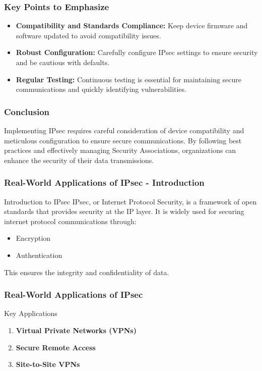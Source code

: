 \documentclass{beamer}
\begin{document}
\begin{frame}
    \frametitle{Key Points to Emphasize}
    \begin{itemize}
        \item \textbf{Compatibility and Standards Compliance:} Keep device firmware and software updated to avoid compatibility issues.
        \item \textbf{Robust Configuration:} Carefully configure IPsec settings to ensure security and be cautious with defaults.
        \item \textbf{Regular Testing:} Continuous testing is essential for maintaining secure communications and quickly identifying vulnerabilities.
    \end{itemize}
\end{frame}

\begin{frame}
    \frametitle{Conclusion}
    Implementing IPsec requires careful consideration of device compatibility and meticulous configuration to ensure secure communications. By following best practices and effectively managing Security Associations, organizations can enhance the security of their data transmissions.
\end{frame}

\begin{frame}[fragile]
    \frametitle{Real-World Applications of IPsec - Introduction}
    \begin{block}{Introduction to IPsec}
        IPsec, or Internet Protocol Security, is a framework of open standards that provides security at the IP layer. 
        It is widely used for securing internet protocol communications through:
        \begin{itemize}
            \item Encryption
            \item Authentication
        \end{itemize}
        This ensures the integrity and confidentiality of data.
    \end{block}
\end{frame}

\begin{frame}[fragile]
    \frametitle{Real-World Applications of IPsec}
    \begin{block}{Key Applications}
        \begin{enumerate}
            \item \textbf{Virtual Private Networks (VPNs)}
            \item \textbf{Secure Remote Access}
            \item \textbf{Site-to-Site VPNs}
        \end{enumerate}
    \end{block}
\end{frame}
\end{document}
